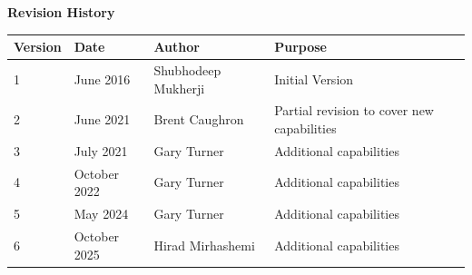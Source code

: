 \documentclass[11pt,fleqn]{report}
\begin{document}
\pagestyle{empty}
\titlePage
{}
\tableofcontents %
\vfill
{\Large \textbf {Revision History}}
{\large
\begin{center}
\begin{tabular}{|l||l|l|l|}
\hline
 \textbf{Version} & \textbf{Date} & \textbf{Author} & \textbf{Purpose} \\
\hline \hline
1 & June 2016 & Shubhodeep Mukherji & Initial Version \\ \hline
2 & June 2021 & Brent Caughron & Partial revision to cover new capabilities \\
\hline
3 & July 2021 & Gary Turner & Additional capabilities \\ \hline
4 & October 2022 & Gary Turner & Additional capabilities \\ \hline
5 & May 2024 & Gary Turner & Additional capabilities \\ \hline
6 & October 2025 & Hirad Mirhashemi & Additional capabilities \\ \hline
\end{tabular}
\end{center}
}
\end{document}
